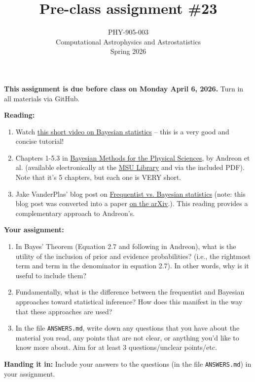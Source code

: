 \documentclass[10pt]{article}
\title{Pre-class assignment \#23}
\author{PHY-905-003\\Computational Astrophysics and
  Astrostatistics\\Spring 2026}
\date{} %
\begin{document}
 
\maketitle

\vspace{-10mm}

\noindent
\textbf{This assignment is due before class on Monday April 6, 2026.}
 Turn in all materials via GitHub.

\vspace{5mm}

\noindent
\textbf{Reading:}

\begin{enumerate}

\item Watch \href{https://www.youtube.com/watch?v=9TDjifpGj-k}{this
    short video on Bayesian statistics} -- this is a very good and
  concise tutorial! 
  
\item Chapters 1-5.3 in
  \href{http://www.springer.com/us/book/9783319152868}{Bayesian
    Methods for the Physical Sciences}, by Andreon et al.  (available
  electronically 
  at the
  \href{https://link-springer-com.proxy2.cl.msu.edu/book/10.1007\%2F978-3-319-15287-5}{MSU
    Library} and via the included PDF).  Note that it's 5 chapters,
  but each one is VERY short.

\item Jake VanderPlas' blog post on
  \href{http://jakevdp.github.io/blog/2014/03/11/frequentism-and-bayesianism-a-practical-intro/}{Frequentist
    vs. Bayesian statistics} (note: this blog post was converted into
  a paper \href{https://arxiv.org/abs/1411.5018}{on the arXiv}.).
  This reading provides a complementary approach to Andreon's.

\end{enumerate}

\noindent
\textbf{Your assignment:}

\begin{enumerate}

\item In Bayes' Theorem (Equation 2.7 and following in Andreon), what
  is the utility of the inclusion of prior and evidence probabilities?
  (i.e., the rightmost term and term in the denominator in equation
  2.7).  In other words, why is it useful to include them?

\item Fundamentally, what is the difference between the frequentist
  and Bayesian approaches toward statistical inference?  How does this
  manifest in the way that these approaches are used?

\item In the file \texttt{ANSWERS.md}, write down any questions that
you have about the material you read,
 any points that are not clear, or anything you'd
like to know more about.  Aim for at
least 3 questions/unclear points/etc. 

\end{enumerate}

\noindent \textbf{Handing it in:} Include 
your answers to the questions (in the file \texttt{ANSWERS.md})
in your assignment.
\end{document}
